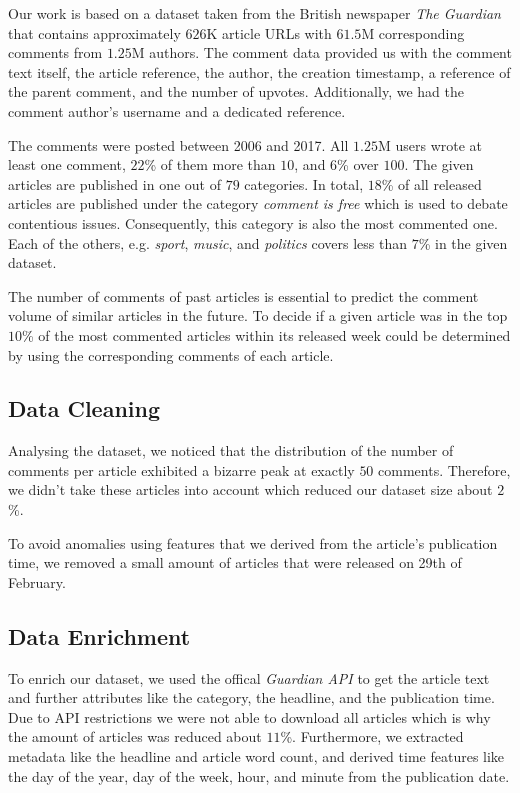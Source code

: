 Our work is based on a dataset taken from the British newspaper \textit{The Guardian} that contains approximately $626$K article URLs with $61.5$M corresponding comments from $1.25$M authors.
The comment data provided us with the comment text itself, the article reference, the author, the creation timestamp, a reference of the parent comment, and the number of upvotes. Additionally, we had the comment author's username and a dedicated reference.

The comments were posted between 2006 and 2017. All $1.25$M users wrote at least one comment, $22$\% of them more than $10$, and $6$\% over $100$.
The given articles are published in one out of $79$ categories. In total, $18$\% of all released articles are published under the category \textit{comment is free} which is used to debate contentious issues. Consequently, this category is also the most commented one. 
Each of the others, e.g. \textit{sport}, \textit{music}, and \textit{politics} covers less than $7$\% in the given dataset.

The number of comments of past articles is essential to predict the comment volume of similar articles in the future. 
To decide if a given article was in the top $10$\% of the most commented articles within its released week could be determined by using the corresponding comments of each article.

\subsection{Data Cleaning}
Analysing the dataset, we noticed that the distribution of the number of comments per article exhibited a bizarre peak at exactly $50$ comments. Therefore, we didn't take these articles into account which reduced our dataset size about $2$\%.

To avoid anomalies using features that we derived from the article's publication time, we removed a small amount of articles that were released on 29th of February.

\subsection{Data Enrichment}
To enrich our dataset, we used the offical \textit{Guardian API} to get the article text and further attributes like the category, the headline, and the publication time.
Due to API restrictions we were not able to download all articles which is why the amount of articles was reduced about $11$\%.
Furthermore, we extracted metadata like the headline and article word count, and derived time features like the day of the year, day of the week, hour, and minute from the publication date.

